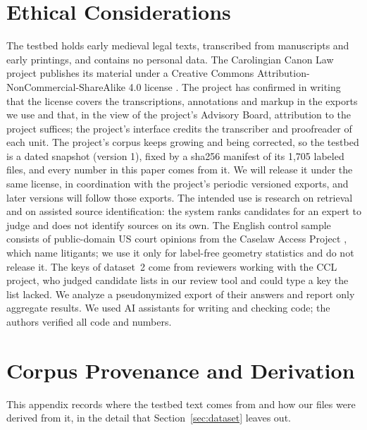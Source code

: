 \documentclass[11pt]{article}
\begin{document}
\section*{Ethical Considerations}

The testbed holds early medieval legal texts, transcribed from manuscripts and early printings, and contains no personal data.
The Carolingian Canon Law project publishes its material under a Creative Commons Attribution-NonCommercial-ShareAlike 4.0 license \citep{ccl2026about}.
The project has confirmed in writing that the license covers the transcriptions, annotations and markup in the exports we use and that, in the view of the project's Advisory Board, attribution to the project suffices; the project's interface credits the transcriber and proofreader of each unit.
The project's corpus keeps growing and being corrected, so the testbed is a dated snapshot (version 1), fixed by a sha256 manifest of its 1,705 labeled files, and every number in this paper comes from it.
We will release it under the same license, in coordination with the project's periodic versioned exports, and later versions will follow those exports.
The intended use is research on retrieval and on assisted source identification: the system ranks candidates for an expert to judge and does not identify sources on its own.
The English control sample consists of public-domain US court opinions from the Caselaw Access Project \citep{cap2024}, which name litigants; we use it only for label-free geometry statistics and do not release it.
The keys of dataset~2 come from reviewers working with the CCL project, who judged candidate lists in our review tool and could type a key the list lacked.
We analyze a pseudonymized export of their answers and report only aggregate results.
We used AI assistants for writing and checking code; the authors verified all code and numbers.



\appendix

\section{Corpus Provenance and Derivation}
\label{app:corpus_provenance}

This appendix records where the testbed text comes from and how our files were derived from it, in the detail that Section~\ref{sec:dataset} leaves out.
\end{document}
